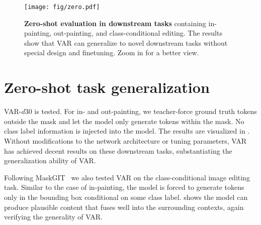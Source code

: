 \begin{figure}[tbh]
\begin{center}
    \texttt{[image: fig/zero.pdf]}
\end{center}
\vspace{-8pt}
\caption{\small
\textbf{Zero-shot evaluation in downstream tasks} containing in-painting, out-painting, and class-conditional editing.
The results show that VAR can generalize to novel downstream tasks without special design and finetuning. Zoom in for a better view.
}
\vspace{-10pt}
\label{fig:zeroshot}
\end{figure}

\section{Zero-shot task generalization} \label{sec:zero}

VAR-$d$30 is tested.
For in- and out-painting, we teacher-force ground truth tokens outside the mask and let the model only generate tokens within the mask.
No class label information is injected into the model.
The results are visualized in .
Without modiﬁcations to the network architecture or tuning parameters, VAR has achieved decent results on these downstream tasks, substantiating the generalization ability of VAR.

Following MaskGIT~\cite{maskgit} we also tested VAR on the class-conditional image editing task.
Similar to the case of in-painting, the model is forced to generate tokens only in the bounding box conditional on some class label.
 shows the model can produce plausible content that fuses well into the surrounding contexts, again verifying the generality of VAR.

